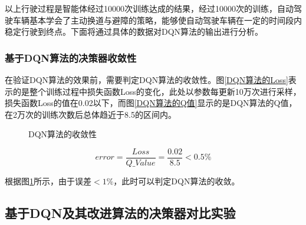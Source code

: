 以上行驶过程是智能体经过10000次训练达成的结果，经过10000次的训练，自动驾驶车辆基本学会了主动换道与避障的策略，能够使自动驾驶车辆在一定的时间段内稳定行驶到终点。下面将通过具体的数据对DQN算法的输出进行分析。

\subsubsection{基于DQN算法的决策器收敛性}

在验证DQN算法的效果前，需要判定DQN算法的收敛性。图\ref{DQN算法的Loss}表示的是整个训练过程中损失函数Loss的变化，此处以参数每更新10万次进行采样，损失函数Loss的值在0.02以下，而图\ref{DQN算法的Q值}显示的是DQN算法的Q值，在2万次的训练次数后总体趋近于8.5的区间内。

\begin{figure}[htbp]
    \vspace{13pt}
    \centering
    \caption{DQN算法的收敛性}\label{DQN算法的收敛性} 
\end{figure}

\begin{equation}
    error = \frac{Loss}{Q\_Value} = \frac{0.02}{8.5} < 0.5\%
\end{equation}\label{dqn-decision-error}

根据图\ref{DQN算法的收敛性}所示，由于误差$<1\%$，此时可以判定DQN算法的收敛。

\subsection{基于DQN及其改进算法的决策器对比实验}


